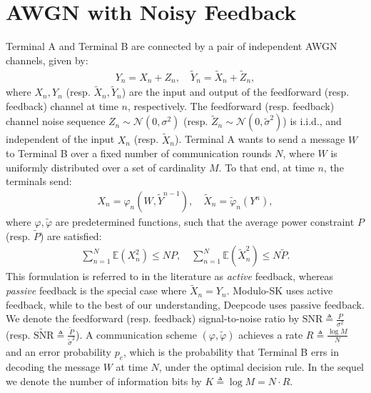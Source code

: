 \documentclass[article,onecolumn,11pt]{IEEEtran}
\newcommand{\snr}{\mathrm{SNR}}
\newcommand{\bsnr}{\mathrm{S}\wt{\mathrm{N}}\mathrm{R}}
\newcommand{\dsnr}{\Delta\snr}
\newcommand{\Pe}{p_e}
\newcommand{\dfn}{\triangleq}
\def\wt{\widetilde}
\begin{document}
\section{AWGN with Noisy Feedback}
Terminal A and Terminal B are connected by a pair of independent AWGN channels, given by:
\begin{align}
Y_n=X_n+Z_n ,\quad \wt{Y}_n=\wt{X}_n+\wt{Z}_n,
\end{align}
where $X_n, Y_n$ (resp. $\wt{X}_n,\wt{Y}_n$) are the input and output of the feedforward (resp. feedback) channel at time $n$, respectively. The feedforward (resp. feedback) channel noise sequence $Z_n\sim \mathcal{N}(0,\sigma^2)$ (resp. $\wt{Z}_n\sim \mathcal{N}(0,\wt{\sigma}^2)$) is i.i.d., and independent of the input $X_n$ (resp. $\wt{X}_n$). Terminal A wants to send a message $W$ to Terminal B over a fixed number of communication rounds $N$, where $W$ is uniformly distributed over a set of cardinality $M$. To that end, at time $n$, the terminals send: 
\begin{align}
  X_n=\varphi_n(W,\wt{Y}^{n-1}), \quad \wt{X}_n=\wt{\varphi}_n(Y^n), 
\end{align}
where $\varphi,\wt{\varphi}$ are predetermined functions, 
such that the average power constraint $P$ (resp. $\wt{P}$) are satisfied: 
\begin{align}
\sum_{n=1}^N\mathbb{E}(X_n^2) \leq N P, \quad \sum_{n=1}^N\mathbb{E}(\wt{X}_n^2) \leq N \wt{P} .
\end{align}
This formulation is referred to in the literature as \textit{active} feedback, whereas \textit{passive} feedback is the special case where $\wt{X}_n=Y_n$. Modulo-SK uses active feedback, while to the best of our understanding, Deepcode uses passive feedback. We denote the feedforward (resp. feedback) signal-to-noise ratio by $\snr\dfn\frac{P}{\sigma^2}$ 
(resp.  $\bsnr\dfn \frac{\wt{P}}{\wt{\sigma}^2}$). %
A communication scheme $(\varphi,\wt{\varphi})$ achieves a rate $R\dfn \frac{\log{M}}{N}$ and an error probability $\Pe$, which is the probability that Terminal B errs in decoding the message $W$ at time $N$, under the optimal decision rule.
{In the sequel we denote the number of information bits by $K\triangleq \log M=N\cdot R$.}
\newline
\end{document}
